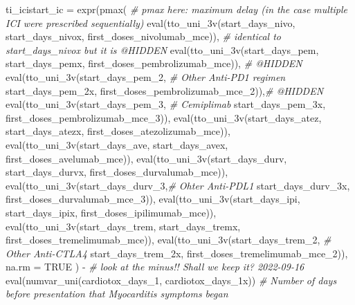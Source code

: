 \documentclass[
]{book}
\newenvironment{Shaded}{\begin{snugshade}}{\end{snugshade}}
\newcommand{\AttributeTok}[1]{\textcolor[rgb]{0.77,0.63,0.00}{#1}}
\newcommand{\CommentTok}[1]{\textcolor[rgb]{0.56,0.35,0.01}{\textit{#1}}}
\newcommand{\ConstantTok}[1]{\textcolor[rgb]{0.00,0.00,0.00}{#1}}
\newcommand{\FunctionTok}[1]{\textcolor[rgb]{0.00,0.00,0.00}{#1}}
\newcommand{\NormalTok}[1]{#1}
\newcommand{\OtherTok}[1]{\textcolor[rgb]{0.56,0.35,0.01}{#1}}
\newcommand{\SpecialCharTok}[1]{\textcolor[rgb]{0.00,0.00,0.00}{#1}}
\begin{document}
\begin{Shaded}
\begin{Highlighting}[]
\NormalTok{ti\_icistart\_ic }\OtherTok{=} \FunctionTok{expr}\NormalTok{(}\FunctionTok{pmax}\NormalTok{( }\CommentTok{\# pmax here: maximum delay (in the case multiple ICI were prescribed sequentially)}
   \FunctionTok{eval}\NormalTok{(}\FunctionTok{tto\_uni\_3v}\NormalTok{(start\_days\_nivo,}
\NormalTok{                 start\_days\_nivox,}
\NormalTok{                 first\_doses\_nivolumab\_mce)), }\CommentTok{\# identical to start\_days\_nivox but it is @HIDDEN}
   \FunctionTok{eval}\NormalTok{(}\FunctionTok{tto\_uni\_3v}\NormalTok{(start\_days\_pem,}
\NormalTok{                 start\_days\_pemx,}
\NormalTok{                 first\_doses\_pembrolizumab\_mce)), }\CommentTok{\# @HIDDEN}
   \FunctionTok{eval}\NormalTok{(}\FunctionTok{tto\_uni\_3v}\NormalTok{(start\_days\_pem\_2, }\CommentTok{\# Other Anti{-}PD1 regimen}
\NormalTok{                 start\_days\_pem\_2x,}
\NormalTok{                 first\_doses\_pembrolizumab\_mce\_2)),}\CommentTok{\# @HIDDEN}
   \FunctionTok{eval}\NormalTok{(}\FunctionTok{tto\_uni\_3v}\NormalTok{(start\_days\_pem\_3, }\CommentTok{\# Cemiplimab }
\NormalTok{                 start\_days\_pem\_3x,}
\NormalTok{                 first\_doses\_pembrolizumab\_mce\_3)),}
   \FunctionTok{eval}\NormalTok{(}\FunctionTok{tto\_uni\_3v}\NormalTok{(start\_days\_atez,}
\NormalTok{                 start\_days\_atezx,}
\NormalTok{                 first\_doses\_atezolizumab\_mce)),}
   \FunctionTok{eval}\NormalTok{(}\FunctionTok{tto\_uni\_3v}\NormalTok{(start\_days\_ave,}
\NormalTok{                 start\_days\_avex,}
\NormalTok{                 first\_doses\_avelumab\_mce)),}
   \FunctionTok{eval}\NormalTok{(}\FunctionTok{tto\_uni\_3v}\NormalTok{(start\_days\_durv,}
\NormalTok{                 start\_days\_durvx,}
\NormalTok{                 first\_doses\_durvalumab\_mce)),}
   \FunctionTok{eval}\NormalTok{(}\FunctionTok{tto\_uni\_3v}\NormalTok{(start\_days\_durv\_3,}\CommentTok{\# Ohter Anti{-}PDL1}
\NormalTok{                 start\_days\_durv\_3x,}
\NormalTok{                 first\_doses\_durvalumab\_mce\_3)),}
   \FunctionTok{eval}\NormalTok{(}\FunctionTok{tto\_uni\_3v}\NormalTok{(start\_days\_ipi,}
\NormalTok{                 start\_days\_ipix,}
\NormalTok{                 first\_doses\_ipilimumab\_mce)),}
   \FunctionTok{eval}\NormalTok{(}\FunctionTok{tto\_uni\_3v}\NormalTok{(start\_days\_trem,}
\NormalTok{                 start\_days\_tremx,}
\NormalTok{                 first\_doses\_tremelimumab\_mce)),}
   \FunctionTok{eval}\NormalTok{(}\FunctionTok{tto\_uni\_3v}\NormalTok{(start\_days\_trem\_2, }\CommentTok{\# Other Anti{-}CTLA4}
\NormalTok{                 start\_days\_trem\_2x,}
\NormalTok{                 first\_doses\_tremelimumab\_mce\_2)),}
    \AttributeTok{na.rm =} \ConstantTok{TRUE}
\NormalTok{  ) }\SpecialCharTok{{-}} \CommentTok{\# look at the minus!! Shall we keep it? 2022{-}09{-}16}
    \FunctionTok{eval}\NormalTok{(}\FunctionTok{numvar\_uni}\NormalTok{(cardiotox\_days\_1,}
\NormalTok{                    cardiotox\_days\_1x))}
    \CommentTok{\# Number of days before presentation that Myocarditis symptoms began}
     

\end{Highlighting}
\end{Shaded}
\end{document}
